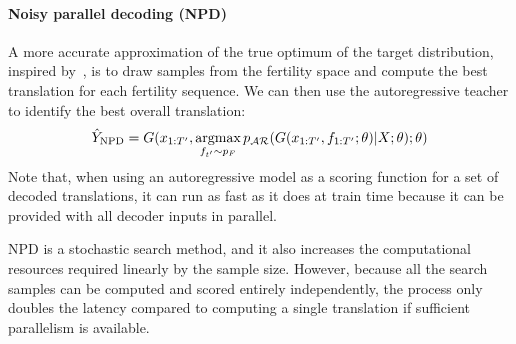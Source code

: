\vspace{-5pt}
\paragraph{Noisy parallel decoding (NPD)} A more accurate approximation of the true optimum of the target distribution, inspired by~\citet{cho2016noisy}, is to draw samples from the fertility space and compute the best translation for each fertility sequence.
We can then use the autoregressive teacher to identify the best overall translation:
\begin{equation}
\hat{Y}_\text{NPD} = G(x_{1:T'}, \mathop{\text{argmax}}_{f_{t'} \sim p_F} p_{\mathcal{AR}}(G(x_{1:T'}, f_{1:T'};\theta)|X;\theta);\theta)
\end{equation}
Note that, when using an autoregressive model as a scoring function for a set of decoded translations, it can run as fast as it does at train time because it can be provided with all decoder inputs in parallel.

NPD is a stochastic search method, and it also increases the computational resources required linearly by the sample size. However, because all the search samples can be computed and scored entirely independently, the process only doubles the latency compared to computing a single translation if sufficient parallelism is available.

